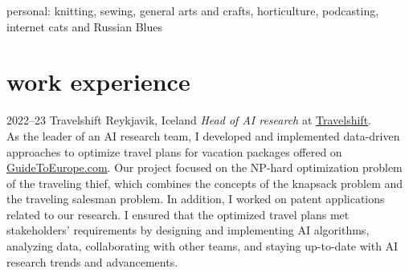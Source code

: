 \documentclass[]{cv} %
\begin{document}
{\boldfont personal:} knitting, sewing, general arts and crafts, horticulture,  podcasting, internet cats and Russian Blues



\section{work experience}


\begin{entrylist}
\entry
{2022--23}
{Travelshift}
{Reykjavik, Iceland}
{\emph{Head of AI research} at
	\href{https://www.travelshift.com/}{Travelshift}.\\
As the leader of an AI research team, I developed and implemented data-driven approaches to optimize travel plans for vacation packages offered on \href{www.guidetoeurope.com}{GuideTo\-Europe.com}. Our project focused on the NP-hard optimization problem of the traveling thief, which combines the concepts of the knapsack problem and the traveling salesman problem. 
In addition, I worked on patent applications related to our research.
I ensured that the optimized travel plans met stakeholders' requirements by designing and implementing AI algorithms, analyzing data, collaborating with other teams, and staying up-to-date with AI research trends and advancements.}
\end{entrylist}

\clearpage
\removeaside
\end{document}
